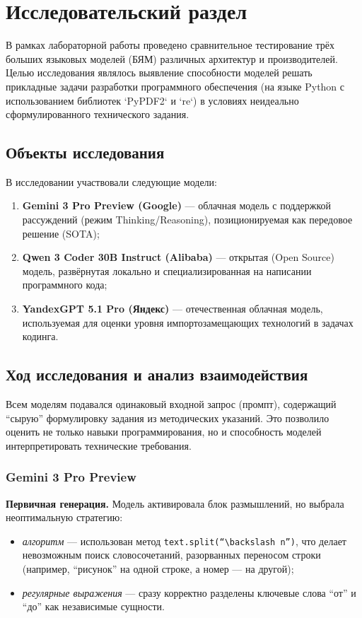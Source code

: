 \chapter{Исследовательский раздел}

В рамках лабораторной работы проведено сравнительное тестирование трёх больших языковых моделей (БЯМ) различных архитектур и производителей. Целью исследования являлось выявление способности моделей решать прикладные задачи разработки программного обеспечения (на языке Python с использованием библиотек `PyPDF2` и `re`) в условиях неидеально сформулированного технического задания.

\section{Объекты исследования}

В исследовании участвовали следующие модели:
\begin{enumerate}
    \item \textbf{Gemini 3 Pro Preview (Google)} --- облачная модель с поддержкой рассуждений (режим Thinking/Reasoning), позиционируемая как передовое решение (SOTA);
    \item \textbf{Qwen 3 Coder 30B Instruct (Alibaba)} --- открытая (Open Source) модель, развёрнутая локально и специализированная на написании программного кода;
    \item \textbf{YandexGPT 5.1 Pro (Яндекс)} --- отечественная облачная модель, используемая для оценки уровня импортозамещающих технологий в задачах кодинга.
\end{enumerate}

\section{Ход исследования и анализ взаимодействия}

Всем моделям подавался одинаковый входной запрос (промпт), содержащий ``сырую'' формулировку задания из методических указаний. Это позволило оценить не только навыки программирования, но и способность моделей интерпретировать технические требования.

\subsection{Gemini 3 Pro Preview}
\textbf{Первичная генерация.} Модель активировала блок размышлений, но выбрала неоптимальную стратегию:
\begin{itemize}
    \item \textit{алгоритм} --- использован метод \texttt{text.split(``$\backslash n$'')}, что делает невозможным поиск словосочетаний, разорванных переносом строки (например, ``рисунок'' на одной строке, а номер --- на другой);
    \item \textit{регулярные выражения} --- сразу корректно разделены ключевые слова ``от'' и ``до'' как независимые сущности.
\end{itemize}

